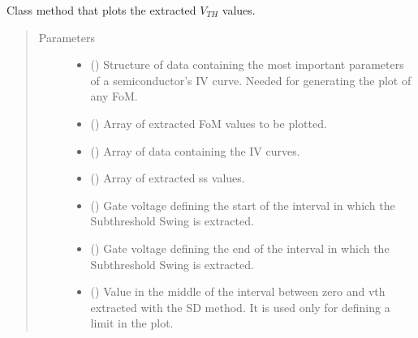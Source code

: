 \documentclass[letterpaper,10pt,english,openany, oneside]{sphinxmanual}
\begin{document}
\begin{fulllineitems}

\begin{fulllineitems}
\label{\detokenize{index:fompy.fom.ss_ext.plot}}
Class method that plots the extracted \(V_{TH}\) values.
\begin{quote}\begin{description}
\item[{Parameters}] \leavevmode\begin{itemize}
\item {} 
 () \textendash{} Structure of data containing the most important parameters of a semiconductor’s IV curve.
Needed for generating the plot of any FoM.

\item {} 
 () \textendash{} Array of extracted FoM values to be plotted.

\item {} 
 () \textendash{} Array of data containing the IV curves.

\item {} 
 () \textendash{} Array of extracted ss values.

\item {} 
 () \textendash{} Gate voltage defining the start of the interval in which the Subthreshold Swing is extracted.

\item {} 
 () \textendash{} Gate voltage defining the end of the interval in which the Subthreshold Swing is extracted.

\item {} 
 () \textendash{} Value in the middle of the interval between zero and vth extracted with the SD method.
It is used only for defining a limit in the plot.


\end{itemize}
\end{description}
\end{quote}
\end{fulllineitems}
\end{fulllineitems}
\end{document}
